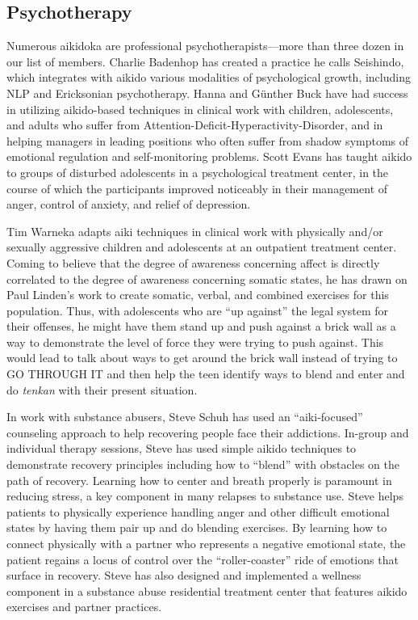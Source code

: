 \subsection*{Psychotherapy}

Numerous aikidoka are professional psychotherapists---more than three dozen in our list of members. Charlie Badenhop has created a practice he calls Seishindo\textregistered, which integrates with aikido various modalities of psychological growth, including NLP and Ericksonian psychotherapy. Hanna and G\"{u}nther Buck have had success in utilizing aikido-based techniques in clinical work with children, adolescents, and adults who suffer from Attention-Deficit-Hyperactivity-Disorder, and in helping managers in leading positions who often suffer from shadow symptoms of emotional regulation and self-monitoring problems. Scott Evans has taught aikido to groups of disturbed adolescents in a psychological treatment center, in the course of which the participants improved noticeably in their management of anger, control of anxiety, and relief of depression.

Tim Warneka adapts aiki techniques in clinical work with physically and/or sexually aggressive children and adolescents at an outpatient treatment center. Coming to believe that the degree of awareness concerning affect is directly correlated to the degree of awareness concerning somatic states, he has drawn on Paul Linden's work to create somatic, verbal, and combined exercises for this population. Thus, with adolescents who are ``up against'' the legal system for their offenses, he might have them stand up and push against a brick wall as a way to demonstrate the level of force they were trying to push against. This would lead to talk about ways to get around the brick wall instead of trying to GO THROUGH IT and then help the teen identify ways to blend and enter and do \emph{tenkan} with their present situation. 

In work with substance abusers, Steve Schuh has used an ``aiki-focused'' counseling approach to help recovering people face their addictions. In-group and individual therapy sessions, Steve has used simple aikido techniques to demonstrate recovery principles including how to ``blend'' with obstacles on the path of recovery. Learning how to center and breath properly is paramount in reducing stress, a key component in many relapses to substance use. Steve helps patients to physically experience handling anger and other difficult emotional states by having them pair up and do blending exercises. By learning how to connect physically with a partner who represents a negative emotional state, the patient regains a locus of control over the ``roller-coaster'' ride of emotions that surface in recovery. Steve has also designed and implemented a wellness component in a substance abuse residential treatment center that features aikido exercises and partner practices.

